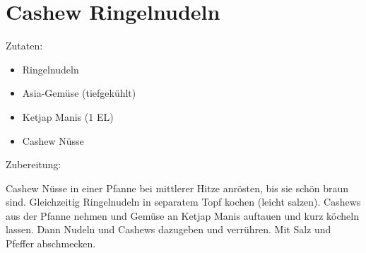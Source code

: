 \section{Cashew Ringelnudeln}
Zutaten:
\begin{itemize}
    \item Ringelnudeln
    \item Asia-Gemüse (tiefgekühlt)
    \item Ketjap Manis (1 EL)
    \item Cashew Nüsse
\end{itemize}

Zubereitung:

Cashew Nüsse in einer Pfanne bei mittlerer Hitze anrösten, bis sie schön braun sind. Gleichzeitig Ringelnudeln in separatem Topf kochen (leicht salzen). Cashews aus der Pfanne nehmen und Gemüse an Ketjap Manis auftauen und kurz köcheln lassen. Dann Nudeln und Cashews dazugeben und verrühren. Mit Salz und Pfeffer abschmecken.

\newpage
\mbox{}
\vfill
\begin{center}
\end{center}
\vfill
\mbox{ }
\newpage
